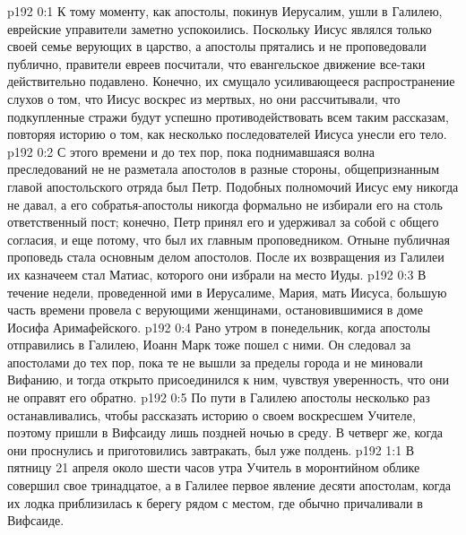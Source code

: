 \vs p192 0:1 К тому моменту, как апостолы, покинув Иерусалим, ушли в Галилею, еврейские управители заметно успокоились. Поскольку Иисус являлся только своей семье верующих в царство, а апостолы прятались и не проповедовали публично, правители евреев посчитали, что евангельское движение все\hyp{}таки действительно подавлено. Конечно, их смущало усиливающееся распространение слухов о том, что Иисус воскрес из мертвых, но они рассчитывали, что подкупленные стражи будут успешно противодействовать всем таким рассказам, повторяя историю о том, как несколько последователей Иисуса унесли его тело.
\vs p192 0:2 С этого времени и до тех пор, пока поднимавшаяся волна преследований не не разметала апостолов в разные стороны, общепризнанным главой апостольского отряда был Петр. Подобных полномочий Иисус ему никогда не давал, а его собратья\hyp{}апостолы никогда формально не избирали его на столь ответственный пост; конечно, Петр принял его и удерживал за собой с общего согласия, и еще потому, что был их главным проповедником. Отныне публичная проповедь стала основным делом апостолов. После их возвращения из Галилеи их казначеем стал Матиас, которого они избрали на место Иуды.
\vs p192 0:3 В течение недели, проведенной ими в Иерусалиме, Мария, мать Иисуса, большую часть времени провела с верующими женщинами, остановившимися в доме Иосифа Аримафейского.
\vs p192 0:4 Рано утром в понедельник, когда апостолы отправились в Галилею, Иоанн Марк тоже пошел с ними. Он следовал за апостолами до тех пор, пока те не вышли за пределы города и не миновали Вифанию, и тогда открыто присоединился к ним, чувствуя уверенность, что они не оправят его обратно.
\vs p192 0:5 По пути в Галилею апостолы несколько раз останавливались, чтобы рассказать историю о своем воскресшем Учителе, поэтому пришли в Вифсаиду лишь поздней ночью в среду. В четверг же, когда они проснулись и приготовились завтракать, был уже полдень.
\vs p192 1:1 В пятницу 21 апреля около шести часов утра Учитель в моронтийном облике совершил свое тринадцатое, а в Галилее первое явление десяти апостолам, когда их лодка приблизилась к берегу рядом с местом, где обычно причаливали в Вифсаиде.

